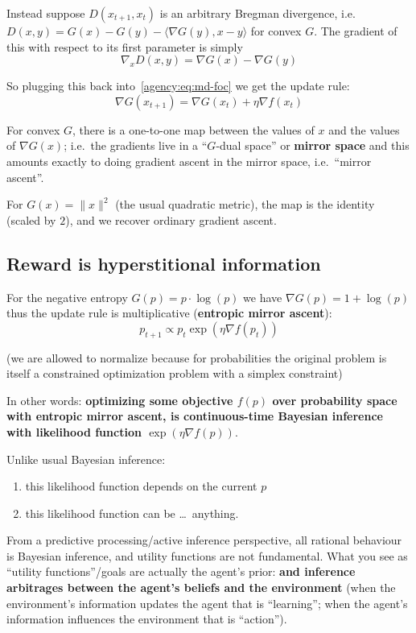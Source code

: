 Instead suppose $D(x_{t+1}, x_t)$ is an arbitrary Bregman divergence, i.e.\
$D(x, y) = G(x) - G(y) - \langle \nabla G(y), x-y\rangle$ for convex $G$. The gradient of
this with respect to its first parameter is simply
\[\nabla_x D(x, y) = \nabla G(x) - \nabla G(y)\]

So plugging this back into~\eqref{agency:eq:md-foc} we get the update rule:
\begin{equation}
\nabla G(x_{t+1}) = \nabla G(x_t) + \eta\nabla f(x_t)\label{agency:eq:md-update}
\end{equation}

For convex $G$, there is a one-to-one map between the values of $x$ and the values of
$\nabla G(x)$; i.e.\ the gradients live in a ``$G$-dual space'' or \textbf{mirror space} and
this amounts exactly to doing gradient ascent in the mirror space, i.e.\ ``mirror ascent''.

For $G(x)= \|x\|^2$ (the usual quadratic metric), the map is the identity (scaled by $2$),
and we recover ordinary gradient ascent.

\subsection{Reward is hyperstitional information}\label{agency:sec:hyperstitional}

For the negative entropy $G(p)=p\cdot\log(p)$ we have $\nabla G(p) = 1+\log(p)$ thus the update rule is
multiplicative (\textbf{entropic mirror ascent}):
\[p_{t+1} \propto p_t\exp\left(\eta\nabla f(p_t)\right)\]

(we are allowed to normalize because for probabilities the original problem is itself a
constrained optimization problem with a simplex constraint)

In other words: \textbf{optimizing some objective $f(p)$ over probability space with
entropic mirror ascent, is continuous-time Bayesian inference with likelihood function
$\exp\left(\eta\nabla f(p)\right)$}.

Unlike usual Bayesian inference:
\begin{enumerate}
  \item this likelihood function depends on the current $p$
  \item this likelihood function can be \ldots\ anything.
\end{enumerate}

From a predictive processing/active inference perspective, all rational behaviour is
Bayesian inference, and utility functions are not fundamental. What you see as ``utility
functions''/goals are actually the agent's prior: \textbf{and inference arbitrages between
the agent's beliefs and the environment} (when the environment's information updates the
agent that is ``learning''; when the agent's information influences the environment that is
``action'').

